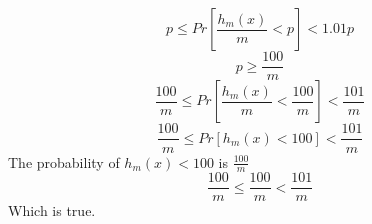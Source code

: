 \subsection*{}

\begin{equation}
    p \le Pr\left[ \frac{h_{m}(x)}{m} < p \right] < 1.01p
\end{equation}
\begin{equation}
    p \ge \frac{100}{m}
\end{equation}
\begin{equation}
    \frac{100}{m} \le Pr\left[ \frac{h_{m}(x)}{m} < \frac{100}{m} \right] < \frac{101}{m}
\end{equation}
\begin{equation}
    \frac{100}{m} \le Pr\left[ h_{m}(x) < 100 \right] < \frac{101}{m}
\end{equation}
The probability of $h_m(x) < 100$ is $\frac{100}{m}$
\begin{equation}
    \frac{100}{m} \le \frac{100}{m} < \frac{101}{m}
\end{equation}
Which is true.




